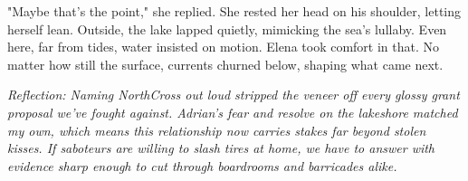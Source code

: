 "Maybe that's the point," she replied. She rested her head on his shoulder, letting herself lean. Outside, the lake lapped quietly, mimicking the sea's lullaby. Even here, far from tides, water insisted on motion. Elena took comfort in that. No matter how still the surface, currents churned below, shaping what came next.


\noindent\textit{Reflection: Naming NorthCross out loud stripped the veneer off every glossy grant proposal we've fought against. Adrian's fear and resolve on the lakeshore matched my own, which means this relationship now carries stakes far beyond stolen kisses. If saboteurs are willing to slash tires at home, we have to answer with evidence sharp enough to cut through boardrooms and barricades alike.}
